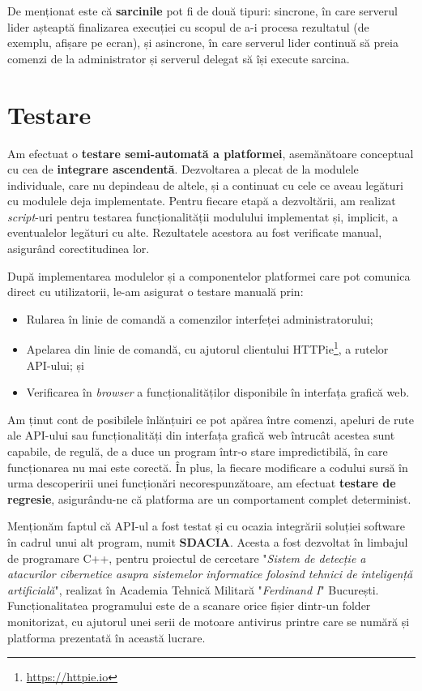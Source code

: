 \documentclass[../../main.tex]{subfiles}
\begin{document}
\newpage

De menționat este că \textbf{sarcinile} pot fi de două tipuri: sincrone, în care serverul lider așteaptă finalizarea execuției cu scopul de a-i procesa rezultatul (de exemplu, afișare pe ecran), și asincrone, în care serverul lider continuă să preia comenzi de la administrator și serverul delegat să își execute sarcina.

\section{Testare}
\label{sec:platform_testing}

Am efectuat o \textbf{testare semi-automată a platformei}, asemănătoare conceptual cu cea de \textbf{integrare ascendentă}. Dezvoltarea a plecat de la modulele individuale, care nu depindeau de altele, și a continuat cu cele ce aveau legături cu modulele deja implementate. Pentru fiecare etapă a dezvoltării, am realizat \textit{script}-uri pentru testarea funcționalității modulului implementat și, implicit, a eventualelor legături cu alte. Rezultatele acestora au fost verificate manual, asigurând corectitudinea lor.

După implementarea modulelor și a componentelor platformei care pot comunica direct cu utilizatorii, le-am asigurat o testare manuală prin:

\begin{itemize}
    \item Rularea în linie de comandă a comenzilor interfeței administratorului;
    \item Apelarea din linie de comandă, cu ajutorul clientului HTTPie\footnote{\href{https://httpie.io}{https://httpie.io}}, a rutelor API-ului; și
    \item Verificarea în \textit{browser} a funcționalităților disponibile în interfața grafică web.
\end{itemize}

Am ținut cont de posibilele înlănțuiri ce pot apărea între comenzi, apeluri de rute ale API-ului sau funcționalități din interfața grafică web întrucât acestea sunt capabile, de regulă, de a duce un program într-o stare impredictibilă, în care funcționarea nu mai este corectă. În plus, la fiecare modificare a codului sursă în urma descoperirii unei funcționări necorespunzătoare, am efectuat \textbf{testare de regresie}, asigurându-ne că platforma are un comportament complet determinist.

Menționăm faptul că API-ul a fost testat și cu ocazia integrării soluției software în cadrul unui alt program, numit \textbf{SDACIA}. Acesta a fost dezvoltat în limbajul de programare C++, pentru proiectul de cercetare "\textit{Sistem de detecție a atacurilor cibernetice asupra sistemelor informatice folosind tehnici de inteligen\-ță artificială}", realizat în Academia Tehnică Militară "\textit{Ferdinand I}" București. Funcționalitatea programului este de a scanare orice fișier dintr-un folder moni\-torizat, cu ajutorul unei serii de motoare antivirus printre care se numără și platforma prezentată în această lucrare.
\end{document}
